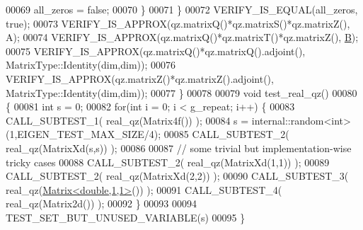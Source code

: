 \begin{DoxyCode}
00069         all\_zeros = \textcolor{keyword}{false};
00070       \}
00071     \}
00072   VERIFY\_IS\_EQUAL(all\_zeros, \textcolor{keyword}{true});
00073   VERIFY\_IS\_APPROX(qz.matrixQ()*qz.matrixS()*qz.matrixZ(), A);
00074   VERIFY\_IS\_APPROX(qz.matrixQ()*qz.matrixT()*qz.matrixZ(), \hyperlink{group___core___module_class_eigen_1_1_matrix}{B});
00075   VERIFY\_IS\_APPROX(qz.matrixQ()*qz.matrixQ().adjoint(), MatrixType::Identity(dim,dim));
00076   VERIFY\_IS\_APPROX(qz.matrixZ()*qz.matrixZ().adjoint(), MatrixType::Identity(dim,dim));
00077 \}
00078 
00079 \textcolor{keywordtype}{void} test\_real\_qz()
00080 \{
00081   \textcolor{keywordtype}{int} s = 0;
00082   \textcolor{keywordflow}{for}(\textcolor{keywordtype}{int} i = 0; i < g\_repeat; i++) \{
00083     CALL\_SUBTEST\_1( real\_qz(Matrix4f()) );
00084     s = internal::random<int>(1,EIGEN\_TEST\_MAX\_SIZE/4);
00085     CALL\_SUBTEST\_2( real\_qz(MatrixXd(s,s)) );
00086 
00087     \textcolor{comment}{// some trivial but implementation-wise tricky cases}
00088     CALL\_SUBTEST\_2( real\_qz(MatrixXd(1,1)) );
00089     CALL\_SUBTEST\_2( real\_qz(MatrixXd(2,2)) );
00090     CALL\_SUBTEST\_3( real\_qz(\hyperlink{group___core___module_class_eigen_1_1_matrix}{Matrix<double,1,1>}()) );
00091     CALL\_SUBTEST\_4( real\_qz(Matrix2d()) );
00092   \}
00093   
00094   TEST\_SET\_BUT\_UNUSED\_VARIABLE(s)
00095 \}
\end{DoxyCode}
